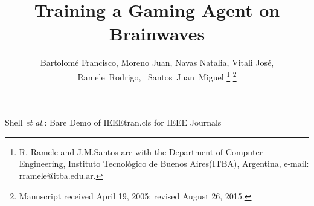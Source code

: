 \documentclass[journal]{IEEEtran}
\begin{document}
%
\title{Training a Gaming Agent on Brainwaves}
%
%
%

\author{Bartolomé Francisco, Moreno Juan,  Navas Natalia, Vitali José, \\
Ramele~Rodrigo,~ 
        Santos~Juan~Miguel%
\thanks{R. Ramele and J.M.Santos are with the Department
of Computer Engineering, Instituto Tecnológico de Buenos Aires(ITBA), Argentina,
e-mail: rramele@itba.edu.ar.}%
\thanks{Manuscript received April 19, 2005; revised August 26, 2015.}}

% 
%



%
{Shell \MakeLowercase{\textit{et al.}}: Bare Demo of IEEEtran.cls for IEEE Journals}
% 
\end{document}
